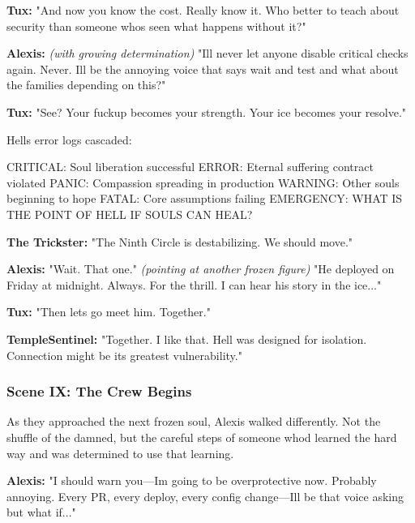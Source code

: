 \textbf{Tux:} "And now you know the cost. Really know it. Who better to teach about security than someone who\textquotesingle s seen what happens without it?"

\textbf{Alexis:} \emph{(with growing determination)} "I\textquotesingle ll never let anyone disable critical checks again. Never. I\textquotesingle ll be the annoying voice that says \textquotesingle wait\textquotesingle{} and \textquotesingle test\textquotesingle{} and \textquotesingle what about the families depending on this?\textquotesingle"

\textbf{Tux:} "See? Your fuckup becomes your strength. Your ice becomes your resolve."

Hell\textquotesingle s error logs cascaded:

\begin{codeblock}
CRITICAL: Soul liberation successful
ERROR: Eternal suffering contract violated
PANIC: Compassion spreading in production
WARNING: Other souls beginning to hope
FATAL: Core assumptions failing
EMERGENCY: WHAT IS THE POINT OF HELL IF SOULS CAN HEAL?
\end{codeblock}

\textbf{The Trickster:} "The Ninth Circle is destabilizing. We should move."

\textbf{Alexis:} "Wait. That one." \emph{(pointing at another frozen figure)} "He deployed on Friday at midnight. Always. For the thrill. I can hear his story in the ice..."

\textbf{Tux:} "Then let\textquotesingle s go meet him. Together."

\textbf{TempleSentinel:} "Together. I like that. Hell was designed for isolation. Connection might be its greatest vulnerability."

\bookdivider

\subsubsection{Scene IX: The Crew Begins}\label{scene-ix-the-crew-begins}

As they approached the next frozen soul, Alexis walked differently. Not the shuffle of the damned, but the careful steps of someone who\textquotesingle d learned the hard way and was determined to use that learning.

\textbf{Alexis:} "I should warn you---I\textquotesingle m going to be overprotective now. Probably annoying. Every PR, every deploy, every config change---I\textquotesingle ll be that voice asking \textquotesingle but what if...\textquotesingle"

